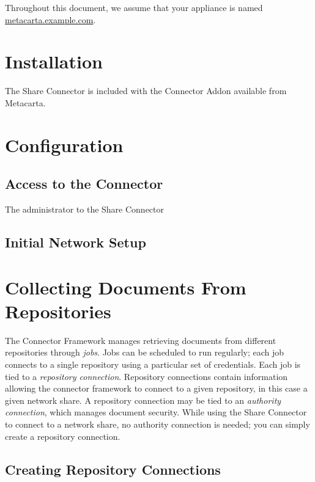 \begin{changemargin}{1.5in}{0in}
Throughout this document, we assume that your appliance is named \\
\url{metacarta.example.com}. 

\section{Installation}

The Share Connector is included with the Connector Addon
available from Metacarta. 

\section{Configuration}

\subsection{Access to the Connector}

The administrator to the Share Connector 

\subsection{Initial Network Setup}



\section{Collecting Documents From Repositories} %

The Connector Framework manages retrieving documents from different
repositories through \emph{jobs}. Jobs can be scheduled to run
regularly; each job connects to a single repository using a particular
set of credentials. Each job is tied to a \emph{repository
connection}. Repository connections contain information allowing the
connector framework to connect to a given repository, in this case a
given network share. A repository connection may be tied to an
\emph{authority connection}, which manages document security. While
using the Share Connector to connect to a network share, no authority
connection is needed; you can simply create a repository connection.



\subsection{Creating Repository Connections}


\end{changemargin}

